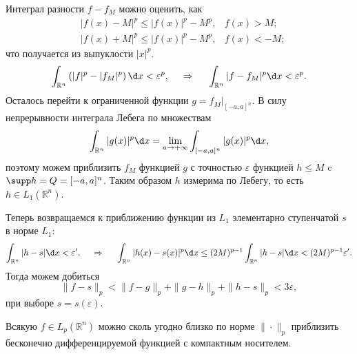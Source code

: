 \begin{uproof}
    Интеграл разности $f - f_M$ можно оценить, как
    \begin{align*}
        &|f(x) -M|^p \leq |f(x)|^p - M^p, &f(x) > M; \\
        &|f(x) +M|^p \leq |f(x)|^p - M^p, &f(x) <- M;
    \end{align*}
    что получается из выпуклости $|x|^p$. 
    \begin{equation*}
        \int_{\mathbb{R}^n} \left(|f|^p - |f_M|^p\right) \d x < \varepsilon^p,
        \hspace{0.5cm} \Rightarrow \hspace{0.5cm}
        \int_{\mathbb{R}^n} |f - f_M|^p \d x < \varepsilon^p.
    \end{equation*}
    Осталось перейти к ограниченной функции $g = f_M |_{[-a, a]^n}$. В силу непрерывности интеграла Лебега по множествам
    \begin{equation*}
        \int_{\mathbb{R}^n} |g(x)|^p \d x = \lim_{a \to + \infty} \int_{[-a, a]^n} |g(x)|^p \d x,
    \end{equation*}
    поэтому можем приблизить $f_M$ функцией $g$ с точностью $\varepsilon$ функцией $h \leq M$ c $\supp h = Q = [-a, a]^n$. Таким образом $h$ измерима по Лебегу, то есть $h \in L_1 \left(\mathbb{R}^n\right)$. 

    Теперь возвращаемся к приближению функции из $L_1$ элементарно ступенчатой $s$ в норме $L_1$:
    \begin{equation*}
        \int_{\mathbb{R}^n} |h-s| \d x < \varepsilon',
        \hspace{0.5cm} \Rightarrow \hspace{0.5cm}
        \int_{\mathbb{R}^n} |h(x) - s(x)|^p \d x \leq (2M)^{p-1} \int_{\mathbb{R}^n} |h-s| \d x < (2M)^{p-1} \varepsilon'.
    \end{equation*}
    Тогда можем добиться 
    \begin{equation*}
        \|f-s\|_p < \|f - g\|_p + \|g-h\|_p + \|h-s\|_p <3 \varepsilon,
    \end{equation*}
    при выборе $s = s(\varepsilon)$.
\end{uproof}



\begin{to_thr}
    Всякую $f \in L_p (\mathbb{R}^n)$ можно сколь угодно близко по норме $\| \cdot \|_p$ приблизить бесконечно дифференцируемой функцией с компактным носителем.
    \label{thr8d17}
\end{to_thr}


